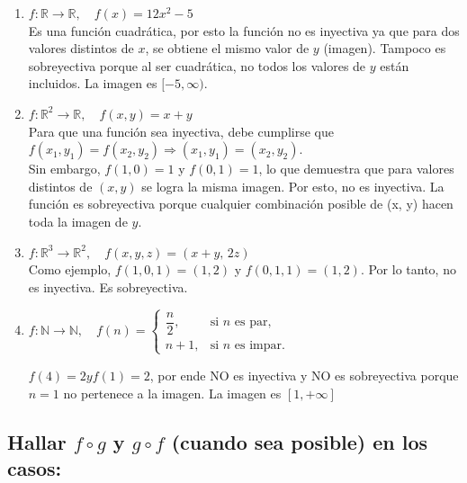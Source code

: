 \documentclass[11pt]{article}
\begin{document}
\begin{enumerate}[label=\roman*)]
    \item $f: \mathbb{R} \rightarrow \mathbb{R}, \quad f(x) = 12x^{2} - 5$ \\[4pt]
    Es una función cuadrática, por esto la función no es inyectiva ya que para dos valores distintos de $x$, se obtiene el mismo valor de $y$ (imagen). 
    Tampoco es sobreyectiva porque al ser cuadrática, no todos los valores de $y$ están incluidos. La imagen es $[-5, \infty)$.

    \item $f: \mathbb{R}^{2} \rightarrow \mathbb{R}, \quad f(x, y) = x + y$ \\[4pt]
    Para que una función sea inyectiva, debe cumplirse que $f(x_{1}, y_{1}) = f(x_{2}, y_{2}) \Rightarrow (x_{1}, y_{1}) = (x_{2}, y_{2})$. \\ 
    Sin embargo, $f(1,0) = 1$ y $f(0,1) = 1$, lo que demuestra que para valores distintos de $(x,y)$ se logra la misma imagen. 
    Por esto, no es inyectiva. La función es sobreyectiva porque cualquier combinación posible de (x, y) hacen toda la imagen de $y$.

    \item $f:\mathbb{R}^{3}\to\mathbb{R}^{2}, \quad f(x,y,z)=(x+y,\,2z)$ \\[4pt]
    Como ejemplo, $f(1,0,1) = (1,2)$ y $f(0,1,1) = (1,2)$. Por lo tanto, no es inyectiva. Es sobreyectiva. 

    \item $f:\mathbb{N}\to\mathbb{N}, \quad
    f(n)=
        \begin{cases}
            \dfrac{n}{2}, & \text{si $n$ es par},\\[6pt]
            n+1, & \text{si $n$ es impar}.
        \end{cases}$
    
    $f(4) = 2 y f(1) = 2$, por ende NO es inyectiva y NO es sobreyectiva porque $n = 1$ no pertenece a la imagen. La imagen es $[1, + \infty]$
\end{enumerate}

\subsection*{Hallar $f \circ g$ y $g \circ f$ (cuando sea posible) en los casos:}
\end{document}
